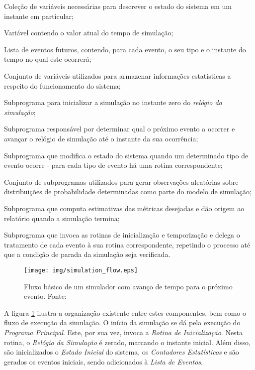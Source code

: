 \begin{description}[leftmargin=!,labelwidth=\widthof{\bfseries Rotina de Inicialização}]
\item[Estado do Sistema] Coleção de variáveis necessárias para descrever o estado do sistema em um instante em particular;
\item[Relógio de Simulação] Variável contendo o valor atual do tempo de simulação;
\item[Lista de Eventos] Lista de eventos futuros, contendo, para cada evento, o
seu tipo e o instante do tempo no qual este ocorrerá;
\item[Contadores Estatísticos] Conjunto de variáveis utilizados para armazenar informações estatísticas a respeito do funcionamento do sistema;
\item[Rotina de Inicialização] Subprograma para inicializar a simulação no
instante zero do \textit{relógio da simulação};
\item[Rotina de Temporização] Subprograma responsável por determinar qual o
próximo evento a ocorrer e avançar o relógio de simulação até o instante da sua
ocorrência;
\item[Rotina de Evento] Subprograma que modifica o estado do sistema quando um determinado tipo de evento ocorre - para cada tipo de evento há uma rotina
correspondente;
\item[Rotinas Auxiliares] Conjunto de subprogramas utilizados para gerar observações aleatórias sobre distribuições de probabilidade determinadas como parte do modelo de simulação;
\item[Gerador de Relatórios] Subprograma que computa estimativas das métricas desejadas e dão origem ao relatório quando a simulação termina;
\item[Programa Principal] Subprograma que invoca as rotinas de inicialização e temporização e delega o tratamento de cada evento à sua rotina correspondente, repetindo o processo até que a condição de parada da simulação seja verificada.
\end{description}

\begin{figure}[htb!]
\centering\texttt{[image: img/simulation\_flow.eps]}
\caption[Fluxo de execução de um simulador.]{\label{fig:simflow}Fluxo básico de um simulador com avanço de tempo para o próximo evento. Fonte:~\cite{Law}}
\end{figure}

A figura \ref{fig:simflow} ilustra a organização existente entre estes
componentes, bem como o fluxo de execução da simulação. O início da simulação se
dá pela execução do \textit{Programa Principal}. Este, por sua vez, invoca a
\textit{Rotina de Inicialização}. Nesta rotina, o \textit{Relógio da Simulação}
é zerado, marcando o instante inicial. Além disso, são inicializados o
\textit{Estado Inicial} do sistema, os \textit{Contadores Estatísticos} e são
gerados os eventos iniciais, sendo adicionados à \textit{Lista de Eventos}.

